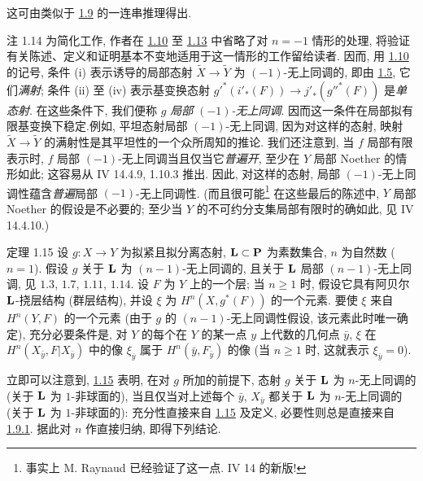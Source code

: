 这可由类似于 \hyperref[XV.prop1.9]{1.9} 的一连串推理得出.

\begin{enonce*}[remark]{注 1.14}
为简化工作, 作者在 \hyperref[XV.prop1.10]{1.10} 至 \hyperref[XV.prop1.13]{1.13} 中省略了对 $n=-1$ 情形的处理, 将验证有关陈述、定义和证明基本不变地适用于这一情形的工作留给读者. 因而, 用 \hyperref[XV.prop1.10]{1.10} 的记号, 条件 (i) 表示诱导的局部态射 $\widetilde{X}\rightarrow \widetilde{Y}$ 为 $(-1)$-无上同调的, 即由 \hyperref[XV.cor1.5]{1.5}, 它们\emph{满射}; 条件 (ii) 至 (iv) 表示基变换态射
${g'}^{\ast}({i'}_{\ast}(F))\rightarrow {j'}_{\ast}({g''}^{\ast}(F))$
是\emph{单态射}. 在这些条件下, 我们便称 $g$ \emph{局部 $(-1)$-无上同调}. 因而这一条件在局部拟有限基变换下稳定.\pageoriginale 例如, 平坦态射局部 $(-1)$-无上同调, 因为对这样的态射, 映射 $\widetilde{X}\rightarrow \widetilde{Y}$ 的满射性是其平坦性的一个众所周知的推论. 我们还注意到, 当 $f$ 局部有限表示时, $f$ 局部 $(-1)$-无上同调当且仅当它\emph{普遍开}, 至少在 $Y$ 局部 Noether 的情形如此; 这容易从 \EGA IV 14.4.9, 1.10.3 推出. 因此, 对这样的态射, 局部 $(-1)$-无上同调性蕴含\emph{普遍}局部 $(-1)$-无上同调性. (而且很可能\footnote[1]{事实上 M. Raynaud 已经验证了这一点. \Cf \EGA IV 14 的新版!} 在这些最后的陈述中, $Y$ 局部 Noether 的假设是不必要的; 至少当 $Y$ 的不可约分支集局部有限时的确如此, 见 \EGA IV 14.4.10.)
\end{enonce*}

\begin{enonce*}{定理 1.15}
设 $g:X\rightarrow Y$ 为拟紧且拟分离态射, $\mathbf{L}\subset \mathbf{P}$ 为素数集合, $n$ 为自然数 (\resp $n=1$). 假设 $g$ 关于 $\mathbf{L}$ 为 $(n-1)$-无上同调的, 且关于 $\mathbf{L}$ 局部 $(n-1)$-无上同调, 见 $\hyperref[XV.def1.3]{1.3}$, $\hyperref[XV.def1.7]{1.7}$, $\hyperref[XV.def1.11]{1.11}$, $\hyperref[XV.rems1.14]{1.14}$. 设 $F$ 为 $Y$ 上的一个层; 当 $n\geq 1$ 时, 假设它具有阿贝尔 $\mathbf{L}$-挠层结构 (\resp 群层结构), 并设 $\xi$ 为 $H^{n}(X,g^{\ast}(F))$ 的一个元素. 要使 $\xi$ 来自 $H^{n}(Y,F)$ 的一个元素 (由于 $g$ 的 $(n-1)$-无上同调性假设, 该元素此时唯一确定), 充分必要条件是, 对 $Y$ 的每个在 $Y$ 的某一点 $y$ 上代数的几何点 $\bar{y}$, $\xi$ 在 $H^{n}(X_{\bar{y}},F|X_{\bar{y}})$ 中的像 $\xi_{\bar{y}}$ 属于 $H^{n}(\bar{y},F_{\bar{y}})$ 的像 (当 $n\geq 1$ 时, 这就\pageoriginale 表示 $\xi_{\bar{y}}=0$).
\end{enonce*}

立即可以注意到, \hyperref[XV.thm1.15]{1.15} 表明, 在对 $g$ 所加的前提下, 态射 $g$ 关于 $\mathbf{L}$ 为 $n$-无上同调的 (\resp 关于 $\mathbf{L}$ 为 $1$-非球面的), 当且仅当对上述每个 $\bar{y}$, $X_{\bar{y}}$ 都关于 $\mathbf{L}$ 为 $n$-无上同调的 (\resp 关于 $\mathbf{L}$ 为 $1$-非球面的): 充分性直接来自 \hyperref[XV.thm1.15]{1.15} 及定义, 必要性则总是直接来自 \hyperref[XV.cor1.9.1]{1.9.1}. 据此对 $n$ 作直接归纳, 即得下列结论.

